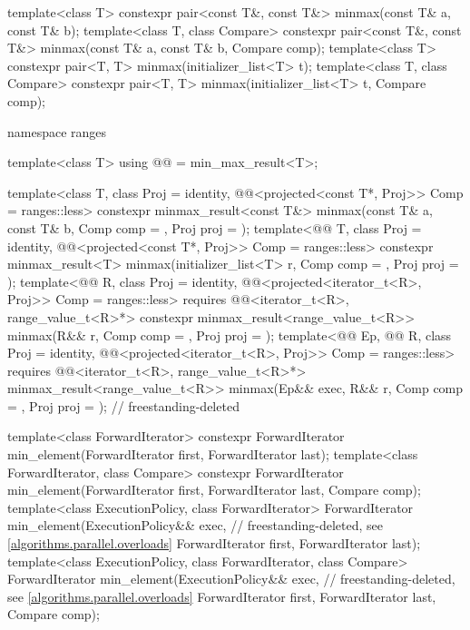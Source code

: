 \begin{codeblock}
{  template<class T> constexpr pair<const T&, const T&> minmax(const T& a, const T& b);
  template<class T, class Compare>
    constexpr pair<const T&, const T&> minmax(const T& a, const T& b, Compare comp);
  template<class T>
    constexpr pair<T, T> minmax(initializer_list<T> t);
  template<class T, class Compare>
    constexpr pair<T, T> minmax(initializer_list<T> t, Compare comp);

  namespace ranges {
    template<class T>
      using @@ = min_max_result<T>;

    template<class T, class Proj = identity,
             @@<projected<const T*, Proj>> Comp = ranges::less>
      constexpr minmax_result<const T&>
        minmax(const T& a, const T& b, Comp comp = {}, Proj proj = {});
    template<@@ T, class Proj = identity,
             @@<projected<const T*, Proj>> Comp = ranges::less>
      constexpr minmax_result<T>
        minmax(initializer_list<T> r, Comp comp = {}, Proj proj = {});
    template<@@ R, class Proj = identity,
             @@<projected<iterator_t<R>, Proj>> Comp = ranges::less>
      requires @@<iterator_t<R>, range_value_t<R>*>
      constexpr minmax_result<range_value_t<R>>
        minmax(R&& r, Comp comp = {}, Proj proj = {});
    template<@@ Ep, @@ R, class Proj = identity,
             @@<projected<iterator_t<R>, Proj>> Comp = ranges::less>
      requires @@<iterator_t<R>, range_value_t<R>*>
      minmax_result<range_value_t<R>>
        minmax(Ep&& exec, R&& r, Comp comp = {}, Proj proj = {});           // freestanding-deleted
  }

  template<class ForwardIterator>
    constexpr ForwardIterator min_element(ForwardIterator first, ForwardIterator last);
  template<class ForwardIterator, class Compare>
    constexpr ForwardIterator min_element(ForwardIterator first, ForwardIterator last,
                                          Compare comp);
  template<class ExecutionPolicy, class ForwardIterator>
    ForwardIterator min_element(ExecutionPolicy&& exec,         // freestanding-deleted, see \ref{algorithms.parallel.overloads}
                                ForwardIterator first, ForwardIterator last);
  template<class ExecutionPolicy, class ForwardIterator, class Compare>
    ForwardIterator min_element(ExecutionPolicy&& exec,         // freestanding-deleted, see \ref{algorithms.parallel.overloads}
                                ForwardIterator first, ForwardIterator last,
                                Compare comp);

}
\end{codeblock}
